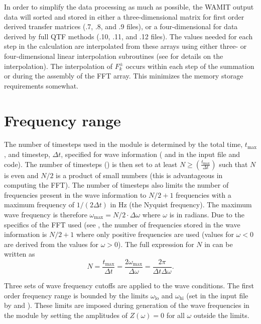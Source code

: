 In order to simplify the data processing as much as possible, the WAMIT output data will sorted and stored in either a three-dimensional matrix for first order derived transfer matrices (.7, .8, and .9 files), or a four-dimensional for data derived by full QTF methods (.10, .11, and .12 files).  The values needed for each step in the calculation are interpolated from these arrays using either three- or four-dimensional linear interpolation subroutines (see  for details on the interpolation). The interpolation of $F^\pm_k$ occurs within each step of the summation or during the assembly of the FFT array.  This minimizes the memory storage requirements somewhat.


\clearpage


\section{Frequency range}
The number of timesteps used in the  module is determined by the total time, $t_\text{max}$, and timestep, $\Delta t$, specified for wave information ( and  in the \HD input file and code).  The number of timesteps () is then set to at least $N \geq  \left(\frac{t_\text{max}}{\Delta t}\right)$ such that $N$ is even and $N/2$ is a product of small numbers (this is advantageous in computing the FFT).
The number of timesteps also limits the number of frequencies present in the wave information to $N/2+1$ frequencies with a maximum frequency of $1/(2 \Delta t)$ in Hz (the Nyquist frequency).
The maximum wave frequency is therefore $\omega_\text{max} = N/2 \cdot \Delta\omega$ where $\omega$ is in radians.
Due to the specifics of the FFT used (see , the number of frequencies stored in the wave information is $N/2+1$ where only positive frequencies are used (values for $\omega < 0$ are derived from the values for $\omega > 0$). 
The full expression for $N$ in can be written as
\begin{equation}
   N = \dfrac{t_\text{max}}{\Delta t} = \dfrac{2 \omega_\text{max}}{\Delta \omega} = \frac{ 2 \pi}{\Delta t \Delta \omega}.
\label{eq:N}
\end{equation}

Three sets of wave frequency cutoffs are applied to the wave conditions.  The first order frequency range is bounded by the limits $\omega_\text{lo}$ and $\omega_\text{hi}$ (set in the \HD input file by  and ).  These limits are imposed during generation of the wave frequencies in the  module by setting the amplitudes of $Z(\omega)=0$ for all $\omega$ outside the limits.

